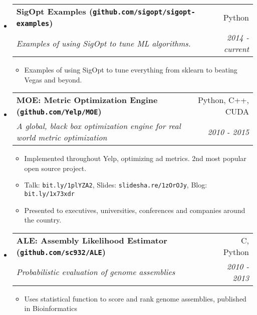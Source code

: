 \documentclass[letterpaper,11pt]{article}
\makeatletter
\newcommand{\resitem}[1]{\item #1 \vspace{-2pt}}
\newcommand{\ressubheading}[4]{
\begin{tabular*}{6.5in}{l@{\cftdotfill{\cftsecdotsep}\extracolsep{\fill}}r}
		\textbf{#1} & #2 \\
		\textit{#3} & \textit{#4} \\
\end{tabular*}\vspace{-6pt}}
\makeatother
\begin{document}
\begin{itemize}

\item
    \ressubheading{SigOpt Examples (\texttt{github.com/sigopt/sigopt-examples})}{Python}{Examples of using SigOpt to tune ML algorithms.}{2014 - current}
    \begin{itemize}
        \resitem{Examples of using SigOpt to tune everything from sklearn to beating Vegas and beyond.}
	\end{itemize}

\item
    \ressubheading{MOE: Metric Optimization Engine (\texttt{github.com/Yelp/MOE})}{Python, C++, CUDA}{A global, black box optimization engine for real world metric optimization}{2010 - 2015}
    \begin{itemize}
        \resitem{Implemented throughout Yelp, optimizing ad metrics. 2nd most popular open source project.}
        \resitem{Talk: \texttt{bit.ly/1plYZA2}, Slides: \texttt{slidesha.re/1zOrOJy}, Blog: \texttt{bit.ly/1x73xdr}}
        \resitem{Presented to executives, universities, conferences and companies around the country.}
	\end{itemize}

\item
    \ressubheading{ALE: Assembly Likelihood Estimator (\texttt{github.com/sc932/ALE})}{C, Python}{Probabilistic evaluation of genome assemblies}{2010 - 2013}
    \begin{itemize}
        \resitem{Uses statistical function to score and rank genome assemblies, published in Bioinformatics}
	\end{itemize}

\end{itemize}


\end{document}
